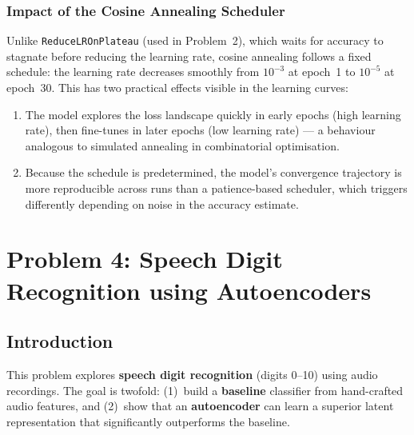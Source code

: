 \documentclass[12pt, a4paper]{article}
\begin{document}

\subsubsection{Impact of the Cosine Annealing Scheduler}

Unlike \texttt{ReduceLROnPlateau} (used in Problem~2), which waits for accuracy to
stagnate before reducing the learning rate, cosine annealing follows a fixed schedule:
the learning rate decreases smoothly from $10^{-3}$ at epoch~1 to $10^{-5}$ at
epoch~30. This has two practical effects visible in the learning curves:
\begin{enumerate}
    \item The model explores the loss landscape quickly in early epochs (high learning
          rate), then fine-tunes in later epochs (low learning rate) --- a behaviour
          analogous to simulated annealing in combinatorial optimisation.
    \item Because the schedule is predetermined, the model's convergence trajectory is
          more reproducible across runs than a patience-based scheduler, which triggers
          differently depending on noise in the accuracy estimate.
\end{enumerate}



\section{Problem 4: Speech Digit Recognition using Autoencoders}

\subsection{Introduction}

This problem explores \textbf{speech digit recognition} (digits 0--10) using audio recordings.
The goal is twofold: (1)~build a \textbf{baseline} classifier from hand-crafted audio features,
and (2)~show that an \textbf{autoencoder} can learn a superior latent representation that
significantly outperforms the baseline.
\end{document}
